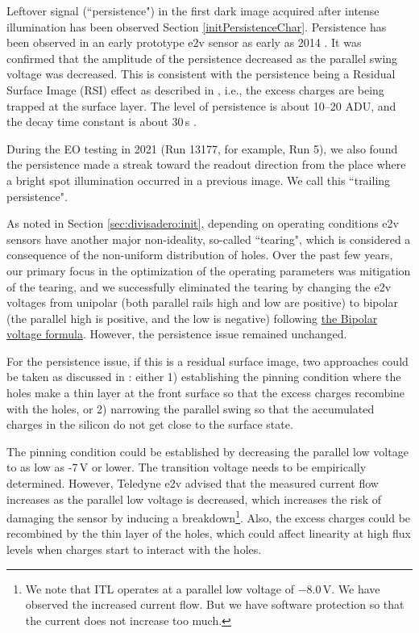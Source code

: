 Leftover signal (``persistence") in the first dark image acquired after intense illumination has
been observed Section \ref{initPersistenceChar}.  Persistence has been observed
in an early prototype e2v sensor as early as 2014
\citep{2014SPIE.9154E..18D}. It was confirmed that the amplitude of
the persistence decreased as the parallel swing voltage was decreased.
This is consistent with the persistence being a Residual Surface Image (RSI) effect as described in
\citet{2001sccd.book.....J}, i.e., the excess charges are being trapped
at the surface layer. The level of persistence is about 10--20 ADU,
and the decay time constant is about 30\,s
\citep{dmtn-276}.

During the EO testing in 2021 (Run 13177, for example, Run 5), we also found the persistence made a
streak toward the readout direction from the place where a bright spot illumination occurred 
in a previous image. We call this ``trailing persistence".

As noted in Section \ref{sec:divisadero:init}, depending on operating conditions e2v sensors have another major non-ideality, so-called ``tearing", which is
considered a consequence of the non-uniform distribution of holes. Over the past few years, our
primary focus in the optimization of the operating parameters was mitigation of the tearing, and we successfully eliminated the tearing by changing the
e2v voltages from unipolar (both parallel rails high and low
are positive) to bipolar (the parallel high is positive, and
the low is negative) following \href{https://github.com/lsst-camera-dh/mkconfigs/blob/master/newformula.py}{the Bipolar voltage formula}.
However, the persistence issue
remained unchanged.

For the persistence issue, if this is a residual surface image, two
approaches could be taken as discussed in \citet{2024SPIE13103E..0WU}:  
either 1) establishing the pinning condition where the holes make a thin
layer at the front surface so that the excess charges recombine with
the holes, or 2) narrowing the parallel swing so that the accumulated
charges in the silicon do not get close to the surface state.

The pinning condition could be established by decreasing the parallel low
voltage to as low as -7\,V or lower. The transition voltage needs to be
empirically determined. However, Teledyne e2v advised that the measured
current flow increases as the parallel low voltage is decreased, which
increases the risk of damaging the sensor by inducing a
breakdown\footnote{We note that ITL operates at a parallel low voltage
  of $-$8.0\,V. We have observed the increased current flow. But we have
  software protection so that the current does not increase too much.}.
Also, the excess charges could be recombined by the thin layer of
the holes, which could affect linearity at high flux levels when
charges start to interact with the holes.

